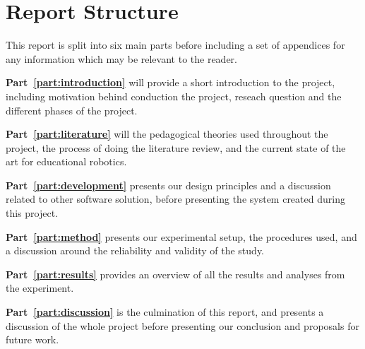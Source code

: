 \section{Report Structure}
This report is split into six main parts before including a set of appendices for any information which may be relevant to the reader.

\bigskip\noindent
\textbf{Part~\ref{part:introduction}} will provide a short introduction to the project, including motivation behind conduction the project, reseach question and the different phases of the project.

\bigskip\noindent
\textbf{Part~\ref{part:literature}} will the pedagogical theories used throughout the project, the process of doing the literature review, and the current state of the art for educational robotics. 

\bigskip\noindent
\textbf{Part~\ref{part:development}} presents our design principles and a discussion related to other software solution, before presenting the system created during this project. 

\bigskip\noindent
\textbf{Part~\ref{part:method}} presents our experimental setup, the procedures used, and a discussion around the reliability and validity of the study.

\bigskip\noindent
\textbf{Part~\ref{part:results}} provides an overview of all the results and analyses from the experiment.

\bigskip\noindent
\textbf{Part~\ref{part:discussion}} is the culmination of this report, and presents a discussion of the whole project before presenting our conclusion and proposals for future work. 

